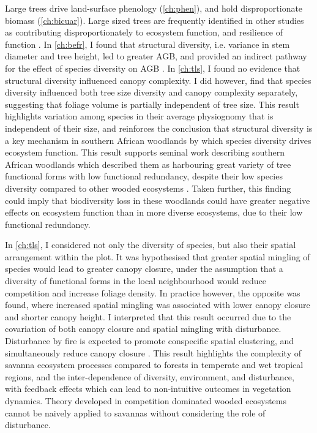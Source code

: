 \begin{refsection}
Large trees drive land-surface phenology (\autoref{ch:phen}), and hold disproportionate biomass (\autoref{ch:bicuar}). Large sized trees are frequently identified in other studies as contributing disproportionately to ecosystem function, and resilience of function \citep{Ali2021}. In \autoref{ch:befr}, I found that structural diversity, i.e. variance in stem diameter and tree height, led to greater AGB, and provided an indirect pathway for the effect of species diversity on AGB \citep{Ali2016, Pedro2017}. In \autoref{ch:tls}, I found no evidence that structural diversity influenced canopy complexity. I did however, find that species diversity influenced both tree size diversity and canopy complexity separately, suggesting that foliage volume is partially independent of tree size. This result highlights variation among species in their average physiognomy that is independent of their size, and reinforces the conclusion that structural diversity is a key mechanism in southern African woodlands by which species diversity drives ecosystem function. This result supports seminal work describing southern African woodlands which described them as harbouring great variety of tree functional forms with low functional redundancy, despite their low species diversity compared to other wooded ecosystems \citep{Solbrig1996}. Taken further, this finding could imply that biodiversity loss in these woodlands could have greater negative effects on ecosystem function than in more diverse ecosystems, due to their low functional redundancy.

In \autoref{ch:tls}, I considered not only the diversity of species, but also their spatial arrangement within the plot. It was hypothesised that greater spatial mingling of species would lead to greater canopy closure, under the assumption that a diversity of functional forms in the local neighbourhood would reduce competition and increase foliage density. In practice however, the opposite was found, where increased spatial mingling was associated with lower canopy closure and shorter canopy height. I interpreted that this result occurred due to the covariation of both canopy closure and spatial mingling with disturbance. Disturbance by fire is expected to promote conspecific spatial clustering, and simultaneously reduce canopy closure \citep{Martens2000}. This result highlights the complexity of savanna ecosystem processes compared to forests in temperate and wet tropical regions, and the inter-dependence of diversity, environment, and disturbance, with feedback effects which can lead to non-intuitive outcomes in vegetation dynamics. Theory developed in competition dominated wooded ecosystems cannot be naively applied to savannas without considering the role of disturbance.


\end{refsection}
